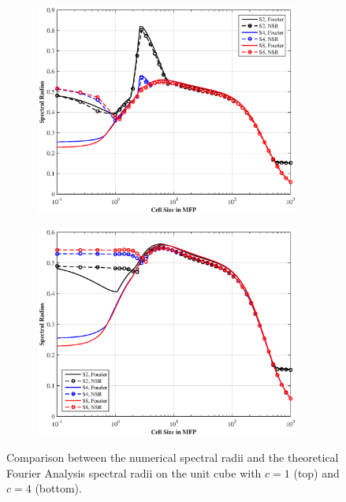\begin{figure}
\centering
	\begin{subfigure}[b]{0.80\textwidth}
		\centering
		\includegraphics[width=0.95\textwidth]{figures/sec_DSA/SI_MIP_hex_C=1_PWLD_LS_wNSR.eps}
	\end{subfigure}
	\vfill
	\begin{subfigure}[b]{0.80\textwidth}
		\centering
		\includegraphics[width=0.95\textwidth]{figures/sec_DSA/SI_MIP_hex_C=4_PWLD_LS_wNSR.eps}
	\end{subfigure}
\caption{Comparison between the numerical spectral radii and the theoretical Fourier Analysis spectral radii on the unit cube with $c=1$ (top) and $c=4$ (bottom).}
\label{fig::DSA_3D1G_Fourier_NSR}
\end{figure}

